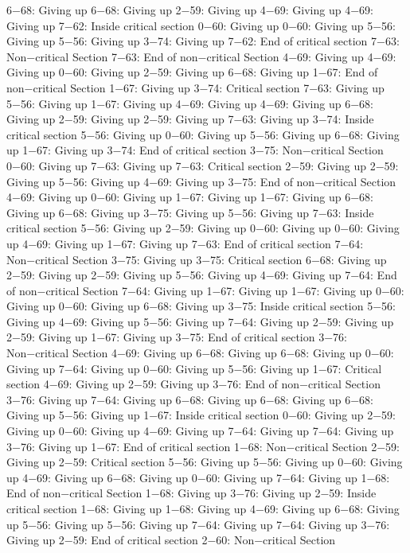 6−68: Giving up
6−68: Giving up
2−59: Giving up
4−69: Giving up
4−69: Giving up
7−62: Inside critical section
0−60: Giving up
0−60: Giving up
5−56: Giving up
5−56: Giving up
3−74: Giving up
7−62: End of critical section
7−63: Non−critical Section
7−63: End of non−critical Section
4−69: Giving up
4−69: Giving up
0−60: Giving up
2−59: Giving up
6−68: Giving up
1−67: End of non−critical Section
1−67: Giving up
3−74: Critical section
7−63: Giving up
5−56: Giving up
1−67: Giving up
4−69: Giving up
4−69: Giving up
6−68: Giving up
2−59: Giving up
2−59: Giving up
7−63: Giving up
3−74: Inside critical section
5−56: Giving up
0−60: Giving up
5−56: Giving up
6−68: Giving up
1−67: Giving up
3−74: End of critical section
3−75: Non−critical Section
0−60: Giving up
7−63: Giving up
7−63: Critical section
2−59: Giving up
2−59: Giving up
5−56: Giving up
4−69: Giving up
3−75: End of non−critical Section
4−69: Giving up
0−60: Giving up
1−67: Giving up
1−67: Giving up
6−68: Giving up
6−68: Giving up
3−75: Giving up
5−56: Giving up
7−63: Inside critical section
5−56: Giving up
2−59: Giving up
0−60: Giving up
0−60: Giving up
4−69: Giving up
1−67: Giving up
7−63: End of critical section
7−64: Non−critical Section
3−75: Giving up
3−75: Critical section
6−68: Giving up
2−59: Giving up
2−59: Giving up
5−56: Giving up
4−69: Giving up
7−64: End of non−critical Section
7−64: Giving up
1−67: Giving up
1−67: Giving up
0−60: Giving up
0−60: Giving up
6−68: Giving up
3−75: Inside critical section
5−56: Giving up
4−69: Giving up
5−56: Giving up
7−64: Giving up
2−59: Giving up
2−59: Giving up
1−67: Giving up
3−75: End of critical section
3−76: Non−critical Section
4−69: Giving up
6−68: Giving up
6−68: Giving up
0−60: Giving up
7−64: Giving up
0−60: Giving up
5−56: Giving up
1−67: Critical section
4−69: Giving up
2−59: Giving up
3−76: End of non−critical Section
3−76: Giving up
7−64: Giving up
6−68: Giving up
6−68: Giving up
6−68: Giving up
5−56: Giving up
1−67: Inside critical section
0−60: Giving up
2−59: Giving up
0−60: Giving up
4−69: Giving up
7−64: Giving up
7−64: Giving up
3−76: Giving up
1−67: End of critical section
1−68: Non−critical Section
2−59: Giving up
2−59: Critical section
5−56: Giving up
5−56: Giving up
0−60: Giving up
4−69: Giving up
6−68: Giving up
0−60: Giving up
7−64: Giving up
1−68: End of non−critical Section
1−68: Giving up
3−76: Giving up
2−59: Inside critical section
1−68: Giving up
1−68: Giving up
4−69: Giving up
6−68: Giving up
5−56: Giving up
5−56: Giving up
7−64: Giving up
7−64: Giving up
3−76: Giving up
2−59: End of critical section
2−60: Non−critical Section
